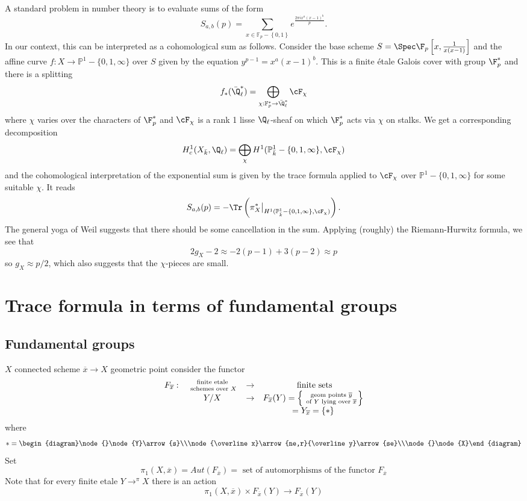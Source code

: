 A standard problem in number theory is to evaluate sums of the form
$$
S_{a,b}(p) = \sum_{x\in \mathbb F_p-\left\{0, 1\right\}} e^{\frac{2\pi ix^a(x-1)^b}{p}}.
$$
In our context, this can be interpreted as a cohomological sum as follows. Consider the base scheme $S = \Spec \F_p\left[x, \frac{1}{x(x-1)}\right]$ and the affine curve $f: X \to \mathbb P^1-\{0, 1, \infty\}$ over $S$ given by the equation $y^{p-1} = x^a(x-1)^b$. This is a finite \'etale Galois cover with group $\F_p^*$ and there is a splitting
$$
f_*(\bar{\Q}_\ell^*) = \bigoplus_{\chi : \mathbb F_p^*\to \bar \Q_\ell^*} \cF_\chi
$$
where $\chi$ varies over the characters of $\F_p^*$ and $\cF_\chi$ is a rank 1 lisse $\Q_\ell$-sheaf on which $\F_p^*$ acts via $\chi$ on stalks. We get a corresponding decomposition
$$
H_c^1(X_{\bar k}, \Q_\ell) = \bigoplus_\chi H^1(\mathbb P_{\bar k}^1-\{0, 1, \infty\}, \cF_\chi)
$$
and the cohomological interpretation of the exponential sum is given by the trace formula applied to $\cF_\chi$ over $\mathbb P^1 - \{0, 1, \infty\}$ for some suitable $\chi$. It reads
$$
S_{a,b}(p) = -\Tr\left(\pi_X^*\big|_{H^1(\mathbb P_{\bar k}^1-\{0, 1, \infty\}, \cF_\chi)}\right).
$$
The general yoga of Weil suggests that there should be some cancellation in the sum. Applying (roughly) the Riemann-Hurwitz formula, we see that
$$
2g_X-2 \approx -2 (p-1) + 3(p-2) \approx p
$$
so $g_X\approx p/2$, which also suggests that the $\chi$-pieces are small.




\section*{Trace formula in terms of fundamental groups}
\subsection{Fundamental groups} $X$ connected scheme $\overline x\to X$ geometric point consider the functor 
	$$\begin{array}{ccccccc}
	F_{\overline x}: & \text{ finite etale }\atop \text{ schemes over } X & \to & \text{ finite sets}\\
	& Y/X & \to & F_{\overline x}(Y) = \left\{\text{ geom points }\overline y\atop \text{ of } Y \text{ lying over }\overline x\right\}\\
	& & &=Y_{\overline x} = \left\{ * \right\}
	\end{array}$$
	where 
	$$*=\begin{diagram}\node{}\node{Y}\arrow{s}\\\node{\overline x}\arrow{ne,r}{\overline y}\arrow{se}\\\node{}\node{X}\end{diagram}$$
	Set 
	$$\pi_1(X, \overline x) = Aut(F_{\overline x})=\text{ set of automorphisms of the functor }F_{\overline x}$$
	Note that for every finite etale $Y\to^\pi X$ there is an action
		$$\pi_1(X, \overline x) \times F_{\overline x}(Y) \to F_{\overline x}(Y)$$
		
